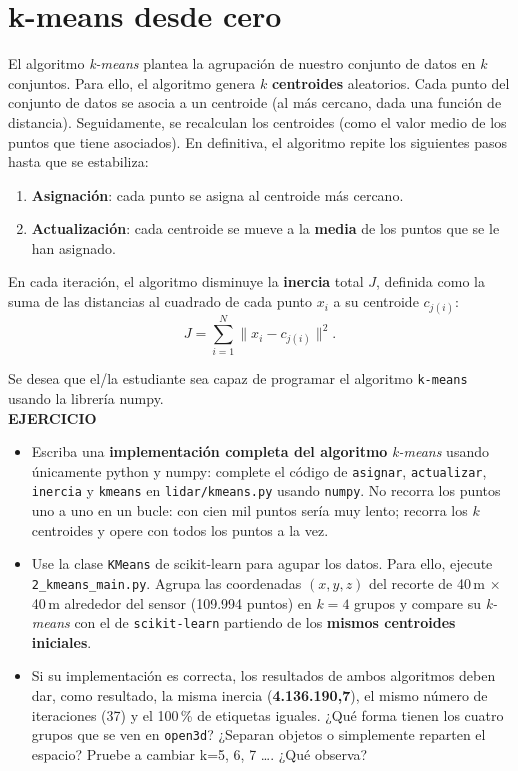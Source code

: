 \documentclass{article}
\begin{document}
\section{k-means desde cero}
El algoritmo \textit{k-means} plantea la agrupación de nuestro conjunto de datos en $k$ conjuntos. Para ello, el algoritmo genera $k$ \textbf{centroides} aleatorios. Cada punto del conjunto de datos se asocia a un centroide (al más cercano, dada una función de distancia). Seguidamente, se recalculan los centroides (como el valor medio de los puntos que tiene asociados). En definitiva, el algoritmo repite los siguientes pasos hasta que se estabiliza:
\begin{enumerate}
    \item \textbf{Asignación}: cada punto se asigna al centroide más cercano.
    \item \textbf{Actualización}: cada centroide se mueve a la \textbf{media} de los puntos que se le han asignado.
\end{enumerate}
En cada iteración, el algoritmo disminuye la \textbf{inercia} total $J$, definida como la suma de las distancias al cuadrado de cada punto $x_i$ a su centroide $c_{j(i)}$:
\[
J = \sum_{i=1}^{N} \lVert x_i - c_{j(i)} \rVert^2 .
\]

\begin{exercise}\label{ej:kmeans}
Se desea que el/la estudiante sea capaz de programar el algoritmo \texttt{k-means} usando la librería numpy.\\
\textbf{EJERCICIO}\\
\begin{itemize}
\item Escriba una \textbf{implementación completa del algoritmo} \textit{k-means} usando únicamente python y numpy: complete el código de \texttt{asignar}, \texttt{actualizar}, \texttt{inercia} y \texttt{kmeans} en \texttt{lidar/kmeans.py} usando \texttt{numpy}. No recorra los puntos uno a uno en un bucle: con cien mil puntos sería muy lento; recorra los $k$ centroides y opere con todos los puntos a la vez.

\item Use la clase \texttt{KMeans} de scikit-learn para agupar los datos. Para ello, ejecute \texttt{2\_kmeans\_main.py}. Agrupa las coordenadas $(x, y, z)$ del recorte de 40\,m $\times$ 40\,m alrededor del sensor (109.994 puntos) en $k = 4$ grupos y compare su \textit{k-means} con el de \texttt{scikit-learn} partiendo de los \textbf{mismos centroides iniciales}. 

\item Si su implementación es correcta, los resultados de ambos algoritmos deben dar, como resultado, la misma inercia (\textbf{4.136.190,7}), el mismo número de iteraciones (37) y el 100\,\% de etiquetas iguales. ¿Qué forma tienen los cuatro grupos que se ven en \texttt{open3d}? ¿Separan objetos o simplemente reparten el espacio? Pruebe a cambiar k=5, 6, 7 \ldots. ¿Qué observa?
\end{itemize}
\end{exercise}
\end{document}
